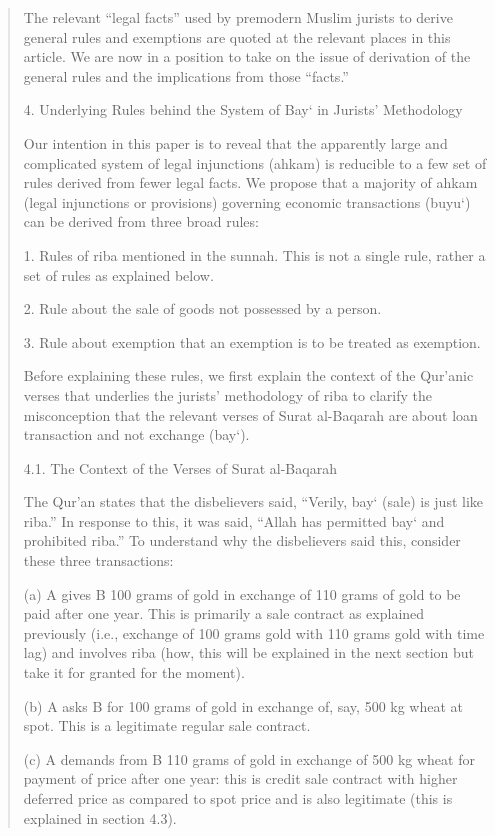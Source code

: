 \begin{quote}
The relevant “legal facts” used by premodern Muslim jurists to derive general rules and exemptions are quoted at the relevant places in this article. We are now in a position to take on the issue of derivation of the general rules and the implications from those “facts.”

4. Underlying Rules behind the System of Bay‘ in Jurists' Methodology

Our intention in this paper is to reveal that the apparently large and complicated system of legal injunctions (ahkam) is reducible to a few set of rules derived from fewer legal facts. We propose that a majority of ahkam (legal injunctions or provisions) governing economic transactions (buyu‘) can be derived from three broad rules:

1. Rules of riba mentioned in the sunnah. This is not a single rule, rather a set of rules as explained below.

2. Rule about the sale of goods not possessed by a person.

3. Rule about exemption that an exemption is to be treated as exemption.

Before explaining these rules, we first explain the context of the Qur'anic verses that underlies the jurists' methodology of riba to clarify the misconception that the relevant verses of Surat al-Baqarah are about loan transaction and not exchange (bay‘).

4.1. The Context of the Verses of Surat al-Baqarah

The Qur'an states that the disbelievers said, “Verily, bay‘ (sale) is just like riba.” In response to this, it was said, “Allah has permitted bay‘ and prohibited riba.” To understand why the disbelievers said this, consider these three transactions:

(a) A gives B 100 grams of gold in exchange of 110 grams of gold to be paid after one year. This is primarily a sale contract as explained previously (i.e., exchange of 100 grams gold with 110 grams gold with time lag) and involves riba (how, this will be explained in the next section but take it for granted for the moment).

(b) A asks B for 100 grams of gold in exchange of, say, 500 kg wheat at spot. This is a legitimate regular sale contract.

(c) A demands from B 110 grams of gold in exchange of 500 kg wheat for payment of price after one year: this is credit sale contract with higher deferred price as compared to spot price and is also legitimate (this is explained in section 4.3).


\end{quote}
